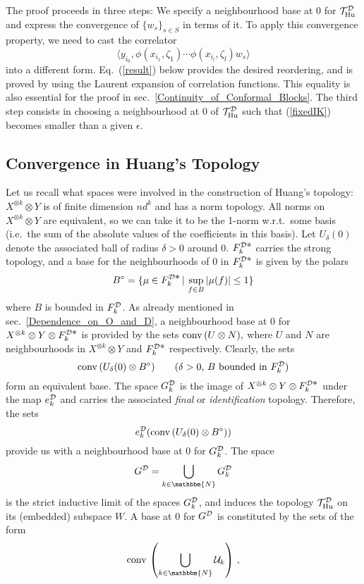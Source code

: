 \documentclass[a4paper,12pt,twoside]{article}
\renewcommand{\b}{\langle}
\renewcommand{\k}{\rangle}
\renewcommand{\c}[1]{{\cal #1}}
\newcommand{\bN}{\mathbbm{N}}
\newcommand{\conv}{{\rm conv\,}}
\newcommand{\cT}{{\cal T}}
\newcommand{\eq}[1]{(\ref{#1})}
\newcommand{\D}{\c{D}}
\newcommand{\Hu}{{\rm Hu}}
\newcommand{\THud}{\cT_{\Hu}^{\D}}
\newcommand{\Fd}{F^{\D}_k}
\newcommand{\Fdd}{F^{\D{\textstyle *}}_k}
\newcommand{\ed}{e_k^{\D}}
\newcommand{\Gdk}{G^{\D}_k}
\newcommand{\Gd}{G^{\D}}
\newcommand{\Bp}{B^{\circ}}
\begin{document}
The proof proceeds in three steps: We specify a neighbourhood base at 0
for $\THud$ and express the convergence of $\{w_s\}_{s\in S}$ in terms
of it. To apply this convergence property, we need to cast the correlator
$$\b y_{i_0},\phi(x_{i_1},\zeta_1)\cdots
\phi(x_{i_l},\zeta_l)w_s\k$$
into a different form. Eq.\ \eq{result} below provides the desired
reordering, and is proved by using the Laurent expansion of
correlation functions. This equality is also essential for the proof in sec.\ \ref{Continuity_of_Conformal_Blocks}.
The third step consists in choosing a neighbourhood at 0 of $\THud$ such that \eq{fixedIK}
becomes smaller than a given $\epsilon$.
\subsection{Convergence in Huang's Topology}
\label{Convergence_in_Huangs_Topology}
Let us recall what spaces were involved in the construction of
Huang's topology:
$X^{\otimes k}\otimes Y$ is of finite dimension $nd^k$ and has a
norm topology. All norms on $X^{\otimes k}\otimes Y$ are
equivalent, so we can take it to be the 1-norm w.r.t.\ some basis
(i.e.\ the sum of the absolute values of the coefficients in this basis).
Let $U_{\delta}(0)$ denote the associated ball of radius $\delta > 0$
around 0. $\Fdd$ carries the strong topology, and a base
for the neighbourhoods of $0$ in $\Fdd$ is given by the polars
$$\Bp = \{\mu\in\Fdd\,|\,\sup_{f\in B} |\mu(f)|
\le 1\}$$ where $B$ is bounded in $\Fd$. As already mentioned in
sec.\ \ref{Dependence_on_O_and_D}, a neighbourhood base at 0 for
$X^{\otimes k}\otimes Y\otimes \Fdd$ is provided
by the sets $\conv(U\otimes N),$
where $U$ and $N$ are neighbourhoods in $X^{\otimes k}\otimes Y$
and $\Fdd$ respectively. Clearly, the sets
$$\conv(U_{\delta}(0)\otimes\Bp)\qquad\mbox{($\delta > 0$, $B$ bounded in
$\Fd$)}$$
form an equivalent base.
The space $\Gdk$ is the image of $X^{\otimes k}\otimes Y\otimes \Fdd$
under the map $\ed$ and carries the associated {\it final} or {\it identification}
topology. Therefore, the sets
\begin{equation}
\label{baseGdk}
\ed(\conv(U_{\delta}(0)\otimes\Bp))
\end{equation}
provide us with a neighbourhood base at 0 for $\Gdk$. The space
$$\Gd = \bigcup_{k\in\bN}\Gdk$$
is the strict inductive limit of the spaces $\Gdk$, and
induces the topology $\THud$ on its (embedded) subspace $W$.
A base at 0 for $\Gd$ is constituted
by the sets of the form
\begin{equation}
\label{baseGd}
\conv\left(\bigcup_{k\in\bN}{\cal U}_k\right)\,,
\end{equation}
\end{document}
